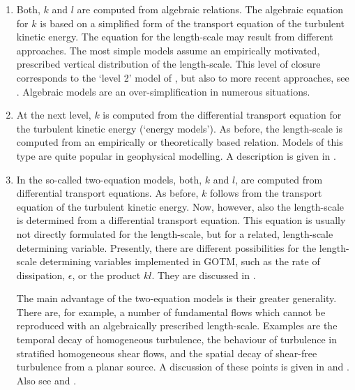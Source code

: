 \begin{enumerate}
\item Both, $k$ and $l$ are computed from algebraic relations. The
 algebraic equation for $k$ is based on a simplified form of the
 transport equation of the turbulent kinetic energy. The
 equation for the length-scale may result from different approaches. The
 most simple models assume an empirically motivated, prescribed
 vertical distribution of the length-scale. This level of closure
 corresponds to the `level 2' model of \cite{MellorYamada82}, but also
 to more recent approaches, see \cite{Chengetal2002}. Algebraic models
 are an over-simplification in numerous situations.

\item At the next level, $k$ is computed from the differential
 transport equation for the turbulent kinetic energy (`energy models'). As
 before, the length-scale is computed from an empirically or theoretically
 based relation. Models of this type are quite popular in geophysical
 modelling. A description is given in .

\item In the so-called two-equation models, both, $k$ and $l$, are computed from
 differential transport equations. As before, $k$ follows from the
 transport equation of the turbulent kinetic energy. Now, however, also
 the length-scale is determined from a differential transport
 equation. This equation is usually not directly formulated for the
 length-scale, but for a related, length-scale determining
 variable. Presently, there are different possibilities for the
 length-scale determining variables implemented in GOTM, such as the
 rate of dissipation, $\epsilon$, or the product $kl$. They are
 discussed in .

 The main advantage of the two-equation models is their greater
 generality. There are, for example, a number of fundamental flows
 which cannot be reproduced with an algebraically prescribed
 length-scale. Examples are the temporal decay of homogeneous
 turbulence, the behaviour of turbulence in stratified
 homogeneous shear flows, and the spatial decay of shear-free
 turbulence from a planar source. A discussion of these points is
 given in  and . Also see
 \cite{Umlaufetal2003} and \cite{UmlaufBurchard2003}.
\end{enumerate}

